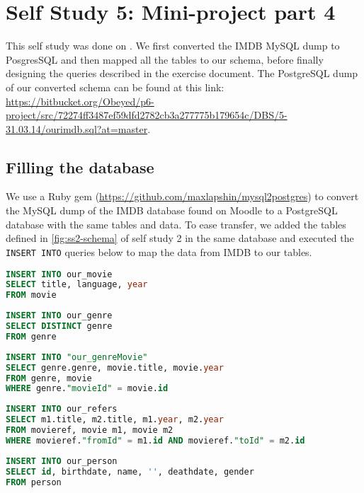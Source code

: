 \section{Self Study 5: Mini-project part 4}
This self study was done on . We first converted the IMDB MySQL dump to PosgresSQL and then mapped all the tables to our schema, before finally designing the queries described in the exercise document. The PostgreSQL dump of our converted schema can be found at this link: \url{https://bitbucket.org/Obeyed/p6-project/src/72274ff3487ef59dfd2782cb3a277775b179654c/DBS/5-31.03.14/ourimdb.sql?at=master}.

\subsection{Filling the database}
We use a Ruby gem (\url{https://github.com/maxlapshin/mysql2postgres}) to convert the MySQL dump of the IMDB database found on Moodle to a PostgreSQL database with the same tables and data. To ease transfer, we added the tables defined in \cref{fig:ss2-schema} of self study 2 in the same database and executed the \texttt{INSERT INTO} queries below to map the data from IMDB to our tables.

\begin{lstlisting}[language=SQL]
INSERT INTO our_movie
SELECT title, language, year
FROM movie
\end{lstlisting}

\begin{lstlisting}[language=SQL]
INSERT INTO our_genre
SELECT DISTINCT genre
FROM genre
\end{lstlisting}

\begin{lstlisting}[language=SQL]
INSERT INTO "our_genreMovie"
SELECT genre.genre, movie.title, movie.year
FROM genre, movie
WHERE genre."movieId" = movie.id
\end{lstlisting}

\begin{lstlisting}[language=SQL]
INSERT INTO our_refers
SELECT m1.title, m2.title, m1.year, m2.year
FROM movieref, movie m1, movie m2
WHERE movieref."fromId" = m1.id AND movieref."toId" = m2.id
\end{lstlisting}

\begin{lstlisting}[language=SQL]
INSERT INTO our_person
SELECT id, birthdate, name, '', deathdate, gender
FROM person
\end{lstlisting}

